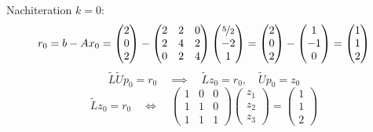 \begin{example}{Nachiteration}
    $k = 0$:
    \[
        r_0 = b - A x_0 =
        \begin{pmatrix}
            2 \\
            0 \\
            2
        \end{pmatrix}
        -
        \begin{pmatrix}
            2 & 2 & 0 \\
            2 & 4 & 2 \\
            0 & 2 & 4
        \end{pmatrix}
        \begin{pmatrix}
            \nicefrac{5}{2} \\
            -2              \\
            1
        \end{pmatrix}
        =
        \begin{pmatrix}
            2 \\
            0 \\
            2
        \end{pmatrix}
        -
        \begin{pmatrix}
            1  \\
            -1 \\
            0
        \end{pmatrix}
        =
        \begin{pmatrix}
            1 \\
            1 \\
            2
        \end{pmatrix}
    \]
    \[
        \tilde{L} \tilde{U} p_0 = r_0 \quad \implies \quad \tilde{L} z_0 = r_0, \quad \tilde{U} p_0 = z_0
    \]
    \[
        \tilde{L} z_0 = r_0 \quad \iff \quad \begin{pmatrix}
            1 & 0 & 0 \\
            1 & 1 & 0 \\
            1 & 1 & 1
        \end{pmatrix}
        \begin{pmatrix}
            z_1 \\
            z_2 \\
            z_3
        \end{pmatrix}
        =
        \begin{pmatrix}
            1 \\
            1 \\
            2
        \end{pmatrix}
\]
\end{example}
